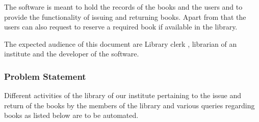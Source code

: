 \documentclass{article}
\begin{document}
The software is meant to hold the records of the books and the users and to provide the functionality of issuing and returning books. Apart from that the users can also request to reserve a required book if available in the library.

The expected audience of this document are Library clerk , librarian of an institute and the developer of the software.
\subsubsection*{Problem Statement}
Different activities of the library of our institute pertaining to the issue and return of the books by the members
of the library and various queries regarding books as listed below are to be automated.
\begin{itemize}



\end{itemize}
\end{document}
